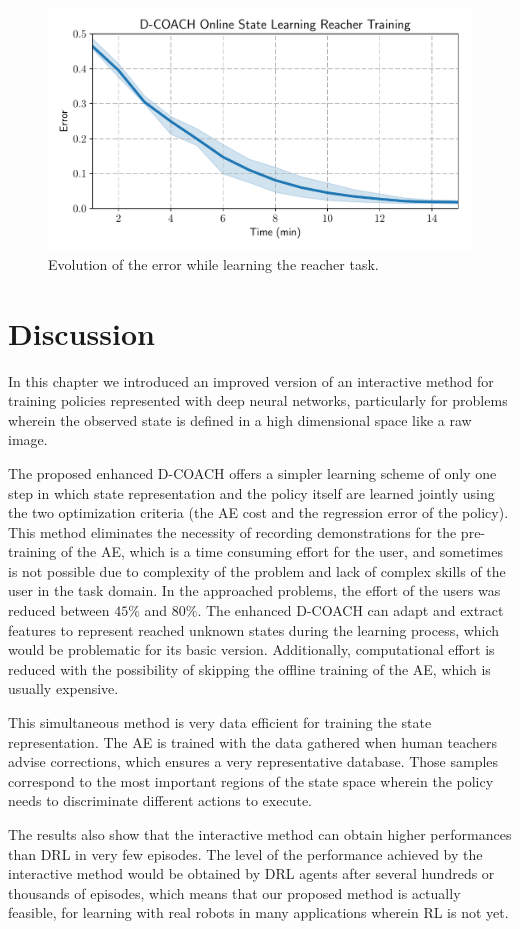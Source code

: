 \begin{figure}[H]
    \centering
    \includegraphics[width=0.9\linewidth]{imagenes/cap3/reacher_ICRA.pdf}
    \caption{Evolution of the error while learning the reacher task. }
    \label{fig:reacher_exp}
\end{figure}

\section{Discussion}

In this chapter we introduced an improved version of an interactive method for training policies represented with deep neural networks, particularly for problems wherein the observed state is defined in a high dimensional space like a raw image.

The proposed enhanced D-COACH offers a simpler learning scheme of only one step in which state representation and the policy itself are learned jointly using the two optimization criteria (the AE cost and the regression error of the policy). This method eliminates the necessity of recording demonstrations for the pre-training of the AE, which is a time consuming effort for the user, and sometimes is not possible due to complexity of the problem and lack of complex skills of the user in the task domain. In the approached problems, the effort of the users was reduced between $45\%$ and $80\%$. The enhanced D-COACH can adapt and extract features to represent reached unknown states during the learning process, which would be problematic for its basic version. Additionally, computational effort is reduced with the possibility of skipping the offline training of the AE, which is usually expensive. 

This simultaneous method is very data efficient for training the state representation. The AE is trained with the data gathered when human teachers advise corrections, which ensures a very representative database. Those samples correspond to the most important regions of the state space wherein the policy needs to discriminate different actions to execute.

The results also show that the interactive method can obtain higher performances than DRL in very few episodes. The level of the performance achieved by the interactive method would be obtained by DRL agents after several hundreds or thousands of episodes, which means that our proposed method is actually feasible, for learning with real robots in many applications wherein RL is not yet.

